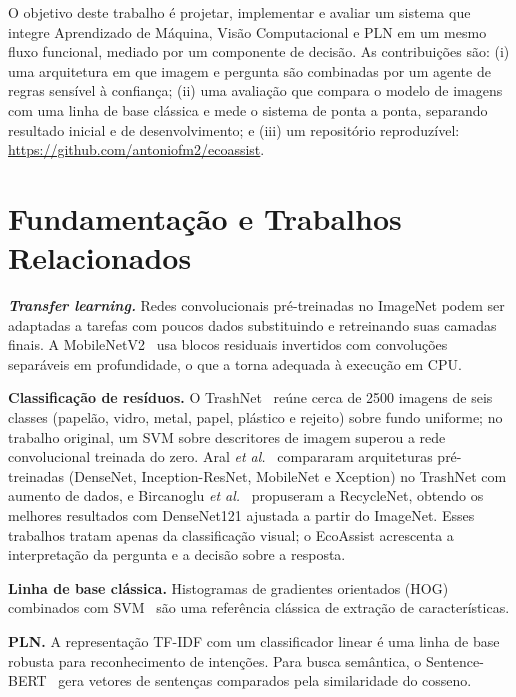 \documentclass[conference]{IEEEtran}
\begin{document}
O objetivo deste trabalho \'e projetar, implementar e avaliar um sistema que integre Aprendizado de M\'aquina, Vis\~ao Computacional e PLN em um mesmo fluxo funcional, mediado por um componente de decis\~ao. As contribui\c{c}\~oes s\~ao: (i) uma arquitetura em que imagem e pergunta s\~ao combinadas por um agente de regras sens\'ivel \`a confian\c{c}a; (ii) uma avalia\c{c}\~ao que compara o modelo de imagens com uma linha de base cl\'assica e mede o sistema de ponta a ponta, separando resultado inicial e de desenvolvimento; e (iii) um reposit\'orio reproduz\'ivel: \url{https://github.com/antoniofm2/ecoassist}.

\section{Fundamenta\c{c}\~ao e Trabalhos Relacionados}
\textbf{\emph{Transfer learning.}} Redes convolucionais pr\'e-treinadas no ImageNet podem ser adaptadas a tarefas com poucos dados substituindo e retreinando suas camadas finais. A MobileNetV2~\cite{sandler2018} usa blocos residuais invertidos com convolu\c{c}\~oes separ\'aveis em profundidade, o que a torna adequada \`a execu\c{c}\~ao em CPU.

\textbf{Classifica\c{c}\~ao de res\'iduos.} O TrashNet~\cite{yang2016} re\'une cerca de 2500 imagens de seis classes (papel\~ao, vidro, metal, papel, pl\'astico e rejeito) sobre fundo uniforme; no trabalho original, um SVM sobre descritores de imagem superou a rede convolucional treinada do zero. Aral \emph{et al.}~\cite{aral2018} compararam arquiteturas pr\'e-treinadas (DenseNet, Inception-ResNet, MobileNet e Xception) no TrashNet com aumento de dados, e Bircanoglu \emph{et al.}~\cite{bircanoglu2018} propuseram a RecycleNet, obtendo os melhores resultados com DenseNet121 ajustada a partir do ImageNet. Esses trabalhos tratam apenas da classifica\c{c}\~ao visual; o EcoAssist acrescenta a interpreta\c{c}\~ao da pergunta e a decis\~ao sobre a resposta.

\textbf{Linha de base cl\'assica.} Histogramas de gradientes orientados (HOG)~\cite{dalal2005} combinados com SVM~\cite{cortes1995} s\~ao uma refer\^encia cl\'assica de extra\c{c}\~ao de caracter\'isticas.

\textbf{PLN.} A representa\c{c}\~ao TF-IDF com um classificador linear \'e uma linha de base robusta para reconhecimento de inten\c{c}\~oes. Para busca sem\^antica, o Sentence-BERT~\cite{reimers2019} gera vetores de senten\c{c}as comparados pela similaridade do cosseno.
\end{document}

